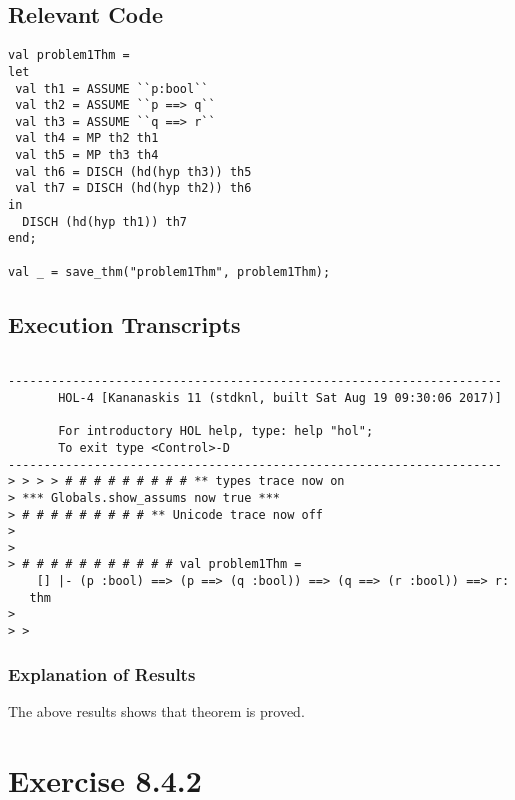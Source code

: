 \documentclass{report}
\begin{document}
\section{Relevant Code}
\label{sec:relevant-code-1}
 \lstset{frameround=fftt}
\begin{lstlisting}[frame=tRBL]
val problem1Thm =
let
 val th1 = ASSUME ``p:bool``
 val th2 = ASSUME ``p ==> q``
 val th3 = ASSUME ``q ==> r``
 val th4 = MP th2 th1
 val th5 = MP th3 th4
 val th6 = DISCH (hd(hyp th3)) th5
 val th7 = DISCH (hd(hyp th2)) th6
in
  DISCH (hd(hyp th1)) th7
end;

val _ = save_thm("problem1Thm", problem1Thm);

\end{lstlisting}


\section{Execution Transcripts}
\label{sec:exec-transcr-1}

\setcounter{sessioncount}{0}
\begin{session}
  \begin{scriptsize}
\begin{verbatim}

---------------------------------------------------------------------
       HOL-4 [Kananaskis 11 (stdknl, built Sat Aug 19 09:30:06 2017)]

       For introductory HOL help, type: help "hol";
       To exit type <Control>-D
---------------------------------------------------------------------
> > > > # # # # # # # # # ** types trace now on
> *** Globals.show_assums now true ***
> # # # # # # # # # ** Unicode trace now off
> 
> 
> # # # # # # # # # # # val problem1Thm =
    [] |- (p :bool) ==> (p ==> (q :bool)) ==> (q ==> (r :bool)) ==> r:
   thm
> 
> > 
\end{verbatim}
  \end{scriptsize}
\end{session}

\subsection{Explanation of Results}
\label{sec:explanation-results-1}
The above results shows that theorem is proved.


 \chapter{Exercise 8.4.2}
 \label{cha:exercise-8.4.2}
  
\end{document}
